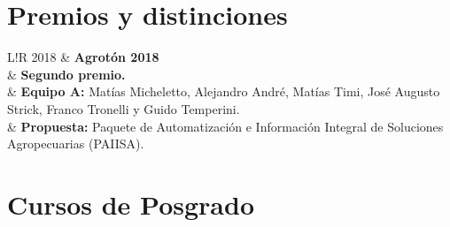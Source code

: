 \documentclass[10pt]{article}
\newcommand\VRule{\color{lightgray}\vrule width 0.5pt}
\begin{document}
\section{Premios y distinciones}
\begin{tabular}{L!{\VRule}R}
2018 & {\bf Agrotón 2018} \\
	 & \textbf{Segundo premio.} \\
	 & \textbf{Equipo A:} Matías Micheletto, Alejandro André, Matías Timi, José Augusto Strick, Franco Tronelli y Guido Temperini. \\
	 & \textbf{Propuesta:} Paquete de Automatización e Información Integral de Soluciones Agropecuarias (PAIISA). \\
\end{tabular}

\section{Cursos de Posgrado}
\end{document}
